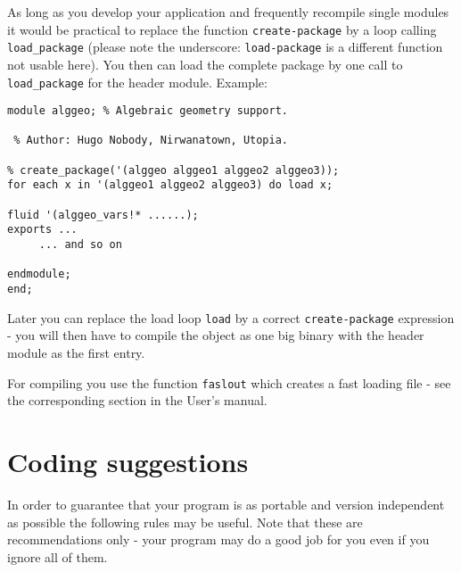 As long as you develop your
application and frequently recompile single modules
it would be practical to replace the function
{\tt create-package} by a loop calling {\tt load\_package} (please
note the underscore: {\tt load-package} is a different 
function not usable here). You then can load the complete package
by one call to {\tt load\_package} for the header
module. Example:

\begin{verbatim}
module alggeo; % Algebraic geometry support.

 % Author: Hugo Nobody, Nirwanatown, Utopia.

% create_package('(alggeo alggeo1 alggeo2 alggeo3));
for each x in '(alggeo1 alggeo2 alggeo3) do load x;

fluid '(alggeo_vars!* ......);
exports ...
     ... and so on

endmodule;
end;
\end{verbatim}
Later you can replace the load loop {\tt load} by a correct 
{\tt create-package} expression - you will then have to compile the 
object as one big binary with the header module as the first
entry.

For compiling you use the function {\tt faslout} which creates
a fast loading file - see the corresponding section in the User's
manual.
\section{Coding suggestions}

In order to guarantee that your program is as portable
and version independent as possible 
the following rules may be useful. Note that these are recommendations
only - your program may do a good job for you even if
you ignore all of them.

